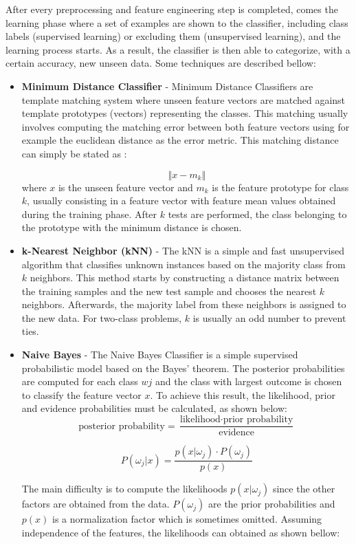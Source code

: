 After every preprocessing and feature engineering step is completed, comes the learning phase where a set of examples are shown to the classifier, including class labels (supervised learning) or excluding them (unsupervised learning), and the learning process starts. As a result, the classifier is then able to categorize, with a certain accuracy, new unseen data. Some techniques are described bellow:
\begin{itemize}
  \item \textbf{Minimum Distance Classifier} - Minimum Distance Classifiers are template matching system where unseen feature vectors are matched against template prototypes (vectors) representing the classes. This matching usually involves computing the  matching error between both feature vectors using for example the euclidean distance as the error metric. This matching distance can simply be stated as :
  
  \[  \left\Vert  x - m_k \right\Vert \]
 where $x$ is the unseen feature vector and $m_k$ is the feature prototype for class $k$, usually consisting in a feature vector with feature mean values obtained during the training phase. After $k$ tests are performed, the class belonging to the prototype with the minimum distance is chosen. 
  
\item \textbf{k-Nearest Neighbor (kNN)}  - The kNN is a simple and fast unsupervised algorithm that classifies unknown instances based on the majority class from $k$ neighbors. This method starts by constructing a distance matrix between the training samples and the new test sample and chooses the nearest $k$ neighbors. Afterwards, the majority label from these neighbors is assigned to the new data. For two-class problems, $k$ is usually an odd number to prevent ties.

\item \textbf{Naive Bayes} - The Naive Bayes Classifier is a simple supervised probabilistic model based on the Bayes' theorem. The posterior probabilities are computed for each class $wj$ and the class with largest outcome is chosen to classify the feature vector $x$. To achieve this result, the likelihood, prior and evidence probabilities must be calculated, as shown below: 
\[  \text{posterior probability} = \frac{ \text{likelihood}  \cdot \text{prior probability}}{\text{evidence}} \]

\[ P(\omega_j|x) = \frac{p(x|\omega_j) \cdot P(\omega_j)}{p(x)} \]

The main difficulty is to compute the likelihoods $p(x|\omega_j)$ since the other factors are obtained from the data. $P(\omega_j)$ are the prior probabilities and $p(x)$ is a normalization factor which is sometimes omitted. Assuming independence of the features, the likelihoods can obtained as shown bellow:


\end{itemize}
